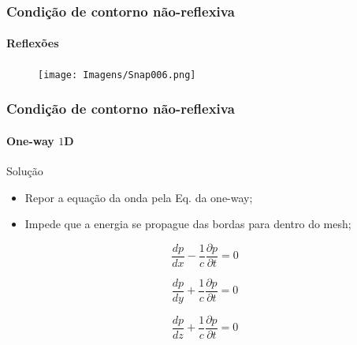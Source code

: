 \documentclass[10pt]{beamer} %
\begin{document}
\begin{frame}
		\frametitle{Condição de contorno não-reflexiva}
		\framesubtitle{Reflexões}
		\begin{block}{}
			\begin{figure}[H]
				\centering
				\texttt{[image: Imagens/Snap006.png]}
			\end{figure}
		\end{block}
\end{frame}


\begin{frame}
	\frametitle{Condição de contorno não-reflexiva}
	\framesubtitle{One-way $1$D}
	\begin{block}{Solução}
		\begin{itemize}
			\item Repor a equação da onda pela Eq.  da one-way;
			\pause 
			\item Impede que a energia se propague das bordas para dentro do mesh;
			\pause
		\end{itemize}
	\end{block}
	
	\begin{block}{}
			\begin{equation}
			\dfrac{dp}{dx} - \dfrac{1}{c} \dfrac{\partial p}{\partial t}= 0
			\end{equation}
	\end{block}
	
		\begin{block}{}
			\begin{equation}
			\dfrac{dp}{dy} + \dfrac{1}{c} \dfrac{\partial p}{\partial t}= 0
			\end{equation}
	\end{block}
	
		\begin{block}{}
			\begin{equation}
			\dfrac{dp}{dz} + \dfrac{1}{c} \dfrac{\partial p}{\partial t}= 0
			\end{equation}
	\end{block}

\end{frame}
\end{document}
